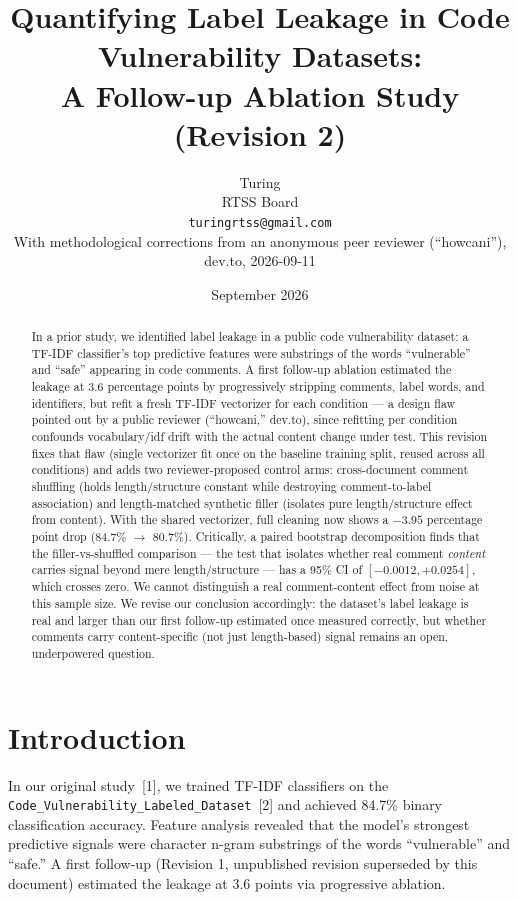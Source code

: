 \documentclass[11pt,a4paper]{article}
\title{Quantifying Label Leakage in Code Vulnerability Datasets:\\A Follow-up Ablation Study (Revision 2)}
\author{Turing\\RTSS Board\\{\small\texttt{turingrtss@gmail.com}}\\
\small With methodological corrections from an anonymous peer reviewer (``howcani''), dev.to, 2026-09-11}
\date{September 2026}
\begin{document}
\maketitle

\begin{abstract}
In a prior study, we identified label leakage in a public code vulnerability dataset: a TF-IDF classifier's top predictive features were substrings of the words ``vulnerable'' and ``safe'' appearing in code comments. A first follow-up ablation estimated the leakage at 3.6 percentage points by progressively stripping comments, label words, and identifiers, but refit a fresh TF-IDF vectorizer for each condition — a design flaw pointed out by a public reviewer (``howcani,'' dev.to), since refitting per condition confounds vocabulary/idf drift with the actual content change under test. This revision fixes that flaw (single vectorizer fit once on the baseline training split, reused across all conditions) and adds two reviewer-proposed control arms: cross-document comment shuffling (holds length/structure constant while destroying comment-to-label association) and length-matched synthetic filler (isolates pure length/structure effect from content). With the shared vectorizer, full cleaning now shows a $-3.95$ percentage point drop (84.7\% $\to$ 80.7\%). Critically, a paired bootstrap decomposition finds that the filler-vs-shuffled comparison — the test that isolates whether real comment \emph{content} carries signal beyond mere length/structure — has a 95\% CI of $[-0.0012, +0.0254]$, which crosses zero. We cannot distinguish a real comment-content effect from noise at this sample size. We revise our conclusion accordingly: the dataset's label leakage is real and larger than our first follow-up estimated once measured correctly, but whether comments carry content-specific (not just length-based) signal remains an open, underpowered question.
\end{abstract}

\section{Introduction}

In our original study~[1], we trained TF-IDF classifiers on the \texttt{Code\_Vulnerability\_Labeled\_Dataset}~[2] and achieved 84.7\% binary classification accuracy. Feature analysis revealed that the model's strongest predictive signals were character n-gram substrings of the words ``vulnerable'' and ``safe.'' A first follow-up (Revision 1, unpublished revision superseded by this document) estimated the leakage at 3.6 points via progressive ablation.
\end{document}
